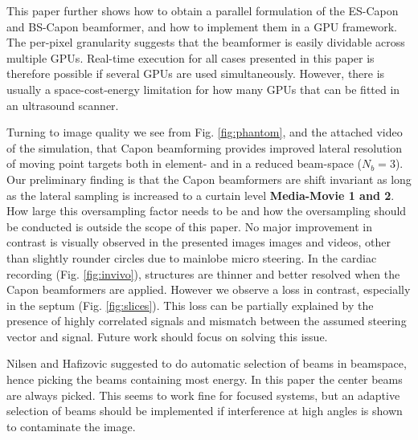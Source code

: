 \documentclass[journal]{IEEEtran}
\newcommand\multimedia[1]{\textbf{{\color{red}#1}}}
\begin{document}
This paper further shows how to obtain a parallel formulation of the ES-Capon and BS-Capon beamformer, and how to implement them in a GPU framework. The per-pixel granularity suggests that the beamformer is easily dividable across multiple GPUs. Real-time execution for all cases presented in this paper is therefore possible if several GPUs are used simultaneously. However, there is usually a space-cost-energy limitation for how many GPUs that can be fitted in an ultrasound scanner.
 
Turning to image quality we see from Fig. \ref{fig:phantom}, and the attached video of the simulation, that Capon beamforming provides improved lateral resolution of moving point targets both in element- and in a reduced beam-space ($N_b=3$). Our preliminary finding is that the Capon beamformers are shift invariant as long as the lateral sampling is increased to a curtain level \multimedia{Media-Movie 1 and 2}. How large this oversampling factor needs to be and how the oversampling should be conducted is outside the scope of this paper. No major improvement in contrast is visually observed in the presented images images and videos, other than slightly rounder circles due to mainlobe micro steering. In the cardiac recording (Fig. \ref{fig:invivo}), structures are thinner and better resolved when the Capon beamformers are applied. However we observe a loss in contrast, especially in the septum (Fig. \ref{fig:slices}). This loss can be partially explained by the presence of highly correlated signals and mismatch between the assumed steering vector and signal. Future work should focus on solving this issue.

Nilsen and Hafizovic suggested to do automatic selection of beams in beamspace, hence picking the beams containing most energy. In this paper the center beams are always picked. This seems to work fine for focused systems, but an adaptive selection of beams should be implemented if interference at high angles is shown to contaminate the image.


\end{document}
